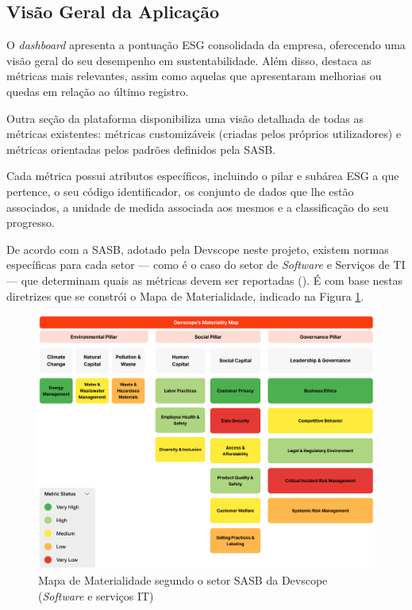 \subsection{Visão Geral da Aplicação}
\label{subsec:VGA} 

O \textit{dashboard} apresenta a pontuação ESG consolidada da empresa, oferecendo uma visão geral do seu desempenho em sustentabilidade. Além disso, destaca as métricas mais relevantes, assim como aquelas que apresentaram melhorias ou quedas em relação ao último registro.

Outra seção da plataforma disponibiliza uma visão detalhada de todas as métricas existentes: métricas customizáveis (criadas pelos próprios utilizadores) e métricas orientadas pelos padrões definidos pela \gls{SASB}.

Cada métrica possui atributos específicos, incluindo o pilar e subárea ESG a que pertence, o seu código identificador, os conjunto de dados que lhe estão associados, a unidade de medida associada aos mesmos e a classificação do seu progresso.

De acordo com a \gls{SASB}, adotado pela Devscope neste projeto, existem normas específicas para cada setor — como é o caso do setor de \textit{Software} e Serviços de TI — que determinam quais as métricas devem ser reportadas (\cite{SASBSector2025}). É com base nestas diretrizes que se constrói o Mapa de Materialidade, indicado na Figura \ref{fig:materiality_map}.

\begin{figure}[H]
    \centering
    \includegraphics[width=5in]{frontmatter/assets/mapa-materialidade.png}
    \caption{Mapa de Materialidade segundo o setor SASB da Devscope (\textit{Software} e serviços IT)}
    \label{fig:materiality_map}
\end{figure}

